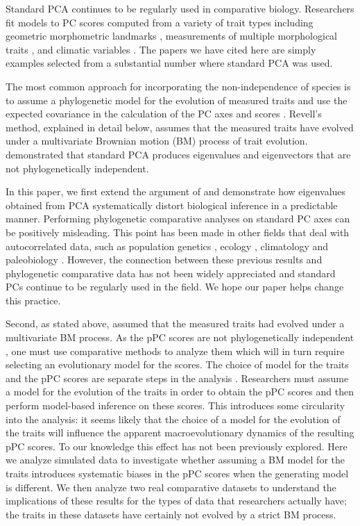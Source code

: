 \documentclass[a4paper,11pt]{article}
\begin{document}
Standard PCA continues to be regularly used in comparative biology. Researchers fit models to PC scores computed from a variety of trait types including geometric morphometric landmarks \citep[e.g.,][]{Dornburg2011, Hunt2013}, measurements of multiple morphological traits \citep[e.g.,][]{Harmon2010, BergmannIrshick2012, Weir2012, Pienaar2013, Price2014}, and climatic variables \citep[e.g.,][]{KozakWiens2010, Schnitzler2012}. The papers we have cited here are simply examples selected from a substantial number where standard PCA was used.

The most common approach for incorporating the non-independence of species is to assume a phylogenetic model for the evolution of measured traits and use the expected covariance in the calculation of the PC axes and scores \citep[phylogenetic Principal Components Analysis, or pPCA;][]{Revell2008}. Revell's method, explained in detail below, assumes that the measured traits have evolved under a multivariate Brownian motion (BM) process of trait evolution. \citet{Revell2008} demonstrated that standard PCA produces eigenvalues and eigenvectors that are not phylogenetically independent. 

In this paper, we first extend the argument of \citet{Revell2008} and demonstrate how eigenvalues obtained from PCA systematically distort biological inference in a predictable manner. Performing phylogenetic comparative analyses on standard PC axes can be positively misleading. This point has been made in other fields that deal with autocorrelated data, such as population genetics \citep{Novembre}, ecology \citep{Podani2002}, climatology \citep{Richman1986} and paleobiology \citep{Bookstein2012}. However, the connection between these previous results and phylogenetic comparative data has not been widely appreciated and standard PCs continue to be regularly used in the field. We hope our paper helps change this practice.

Second, as stated above, \citet{Revell2008} assumed that the measured traits had evolved under a multivariate BM process. As the pPC scores are not phylogenetically independent \citep{Revell2008, Polly2013}, one must use comparative methods to analyze them which will in turn require selecting an evolutionary model for the scores. The choice of model for the traits and the pPC scores are separate steps in the analysis \citep{Revell2008}. Researchers must assume a model for the evolution of the traits in order to obtain the pPC scores and then perform model-based inference on these scores. This introduces some circularity into the analysis: it seems likely that the choice of a model for the evolution of the traits will influence the apparent macroevolutionary dynamics of the resulting pPC scores. To our knowledge this effect has not been previously explored. Here we analyze simulated data to investigate whether assuming a BM model for the traits introduces systematic biases in the pPC scores when the generating model is different. We then analyze two real comparative datasets to understand the implications of these results for the types of data that researchers actually have; the traits in these datasets have certainly not evolved by a strict BM process.
\end{document}
